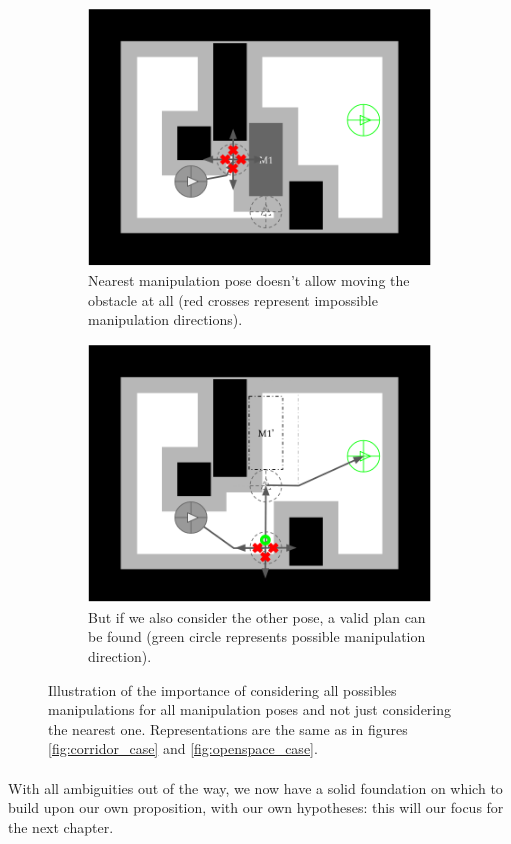\begin{figure}[H]
\centering
\begin{subfigure}{.35\textwidth}
  \centering
  \includegraphics[width=\linewidth]{Figures/Manipulation_Pose/manip_pose_2.png}
  \caption{Nearest manipulation pose doesn't allow moving the obstacle at all (red crosses represent impossible manipulation directions).}
  \label{fig:manip_pose_2}
\end{subfigure}\hspace*{\fill}
\begin{subfigure}{.35\textwidth}
  \centering
  \includegraphics[width=\linewidth]{Figures/Manipulation_Pose/manip_pose_4.png}
  \caption{But if we also consider the other pose, a valid plan can be found (green circle represents possible manipulation direction).}
  \label{fig:manip_pose_4}
\end{subfigure}
\caption{Illustration of the importance of considering all possibles manipulations for all manipulation poses and not just considering the nearest one. Representations are the same as in figures \ref{fig:corridor_case} and \ref{fig:openspace_case}.}
\label{fig:manipulation_poses}
\end{figure}

\paragraph{} With all ambiguities out of the way, we now have a solid foundation on which to build upon our own proposition, with our own hypotheses: this will our focus for the next chapter.
